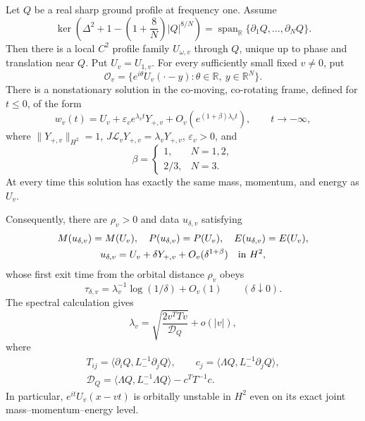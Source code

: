 \begin{theorem}
\label{thm:r12-nonlinear-instability}
Let $Q$ be a real sharp ground profile at frequency one. Assume
\begin{equation}\label{eq:r12-real-nondegeneracy}
 \ker\left(\Delta^2+1-\left(1+\frac8N\right)|Q|^{8/N}\right)
   =\operatorname{span}_{\mathbb R}
        \{\partial_1Q,\ldots,\partial_NQ\}.
\end{equation}
Then there is a local $C^2$ profile family $U_{\omega,v}$ through $Q$,
unique up to phase and translation near $Q$. Put $U_v=U_{1,v}$.
For every sufficiently small fixed $v\ne0$, put
\[
 \mathcal O_v=\{e^{i\theta}U_v(\cdot-y):\theta\in\mathbb R,
                                     \ y\in\mathbb R^N\}.
\]
There is a nonstationary solution in the co-moving, co-rotating frame,
defined for $t\le0$, of the form
\begin{equation}\label{eq:r12-ancient-asymptotic}
 w_v(t)=U_v+\varepsilon_v e^{\lambda_vt}Y_{+,v}
              +O_v(e^{(1+\beta)\lambda_vt}),\qquad t\to-\infty,
\end{equation}
where $\|Y_{+,v}\|_{H^2}=1$, $J\mathcal L_vY_{+,v}
=\lambda_vY_{+,v}$, $\varepsilon_v>0$, and
\[
 \beta=\begin{cases}1,&N=1,2,\\2/3,&N=3.\end{cases}
\]
At every time this solution has exactly the same mass, momentum, and
energy as $U_v$.

Consequently, there are $\rho_v>0$ and data $u_{\delta,v}$ satisfying
\begin{gather*}
 M(u_{\delta,v})=M(U_v),\quad P(u_{\delta,v})=P(U_v),\quad
 E(u_{\delta,v})=E(U_v),\\
 u_{\delta,v}=U_v+\delta Y_{+,v}+O_v(\delta^{1+\beta})
                         \quad\hbox{in }H^2,
\end{gather*}
whose first exit time from the orbital distance $\rho_v$ obeys
\begin{equation}\label{eq:r12-exit-time}
 \tau_{\delta,v}=\lambda_v^{-1}\log(1/\delta)+O_v(1)
 \qquad(\delta\downarrow0).
\end{equation}
The spectral calculation gives
\begin{equation}\label{eq:r12-rate}
 \lambda_v=\sqrt{\frac{2v^TTv}{\mathcal D_Q}}+o(|v|),
\end{equation}
where
\begin{gather*}
 T_{ij}=\langle\partial_iQ,L_-^{-1}\partial_jQ\rangle,
 \qquad c_j=\langle\Lambda Q,L_-^{-1}\partial_jQ\rangle,\\
 \mathcal D_Q=\langle\Lambda Q,L_-^{-1}\Lambda Q\rangle-c^TT^{-1}c.
\end{gather*}
In particular, $e^{it}U_v(x-vt)$ is orbitally unstable in $H^2$ even
on its exact joint mass--momentum--energy level.
\end{theorem}

